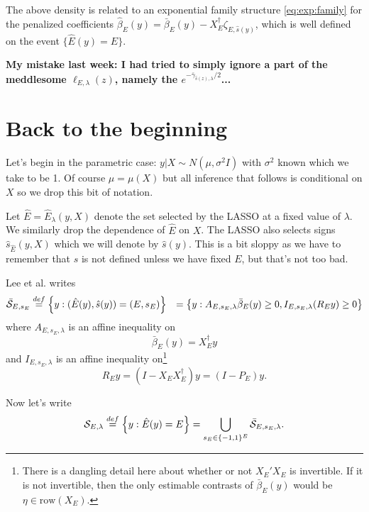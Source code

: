 \documentclass{article}
\newcommand{\OLS}{\bar{\beta}}
\newcommand{\REG}{\hat{\beta}}
\begin{document}
        The above density is related to an exponential family structure \eqref{eq:exp:family}
        for the
        penalized coefficients $\REG_E(y) = \OLS_E(y) - X_E^{\dagger}\zeta_{E,\hat{s}(y)}$,
        which is well defined on the event $\{\hat{E}(y)=E\}.$

        {\bf My mistake last week: I had tried to simply ignore a part of the meddlesome
          $\ell_{E,\lambda}(z)$, namely the $e^{-\bar{\gamma}_{\hat{s}(z),\lambda}/2}$...}

        \section{Back to the beginning}

        Let's begin in the parametric case: $y|X \sim N(\mu, \sigma^2
        I)$ with $\sigma^2$ known which we take to be 1. Of course
        $\mu=\mu(X)$ but all inference that follows is conditional on
        $X$ so we drop this bit of notation.

        Let $\hat{E}=\hat{E}_{\lambda}(y,X)$ denote the set selected
        by the LASSO at a fixed value of $\lambda$. We similarly drop
        the dependence of $\hat{E}$ on $X$.  The LASSO also selects
        signs $\hat{s}_{\hat{E}}(y,X)$ which we will denote by
        $\hat{s}(y)$. This is a bit sloppy as we have to remember that
        $s$ is not defined unless we have fixed $E$, but that's not
        too bad.
        
        Lee et al. writes
        $$
        \begin{aligned}
        \bar{\cal S}_{E,s_E} &\overset{def}{=} \left\{y:
        (\hat{E}(y),\hat{s}(y))=(E, s_E)\right\} &= \left\{y:
        A_{E,s_E,\lambda}\OLS_E(y) \geq 0, I_{E,s_E,\lambda}(R_Ey) \geq 0 \right\}
        \end{aligned}
        $$ where $A_{E,s_E,\lambda}$ is an affine inequality on
        $$ \OLS_E(y) = X_E^{\dagger}y
        $$ and $I_{E,s_E,\lambda}$ is an affine inequality on\footnote{There is a dangling
        detail here about whether or not $X_E'X_E$ is invertible. If it is not invertible,
        then the only estimable contrasts of $\OLS_E(y)$ would be $\eta \in \text{row}(X_E)$.}
        $$ R_Ey = (I - X_EX_E^{\dagger})y=(I-P_E)y.
        $$

        Now let's write
        $$ {\cal S}_{E,\lambda} \overset{def}{=} \left\{y: \hat{E}(y)=E\right\}
        = \bigcup_{s_E \in \{-1,1\}^E} \bar{\cal S}_{E,s_E,\lambda}.
        $$
\end{document}
